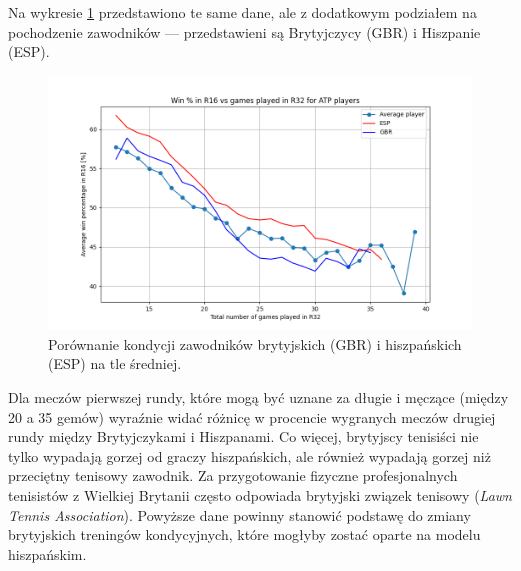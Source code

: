\documentclass[12pt, a4paper]{article}
\begin{document}
Na wykresie \ref{fig:gbr_vs_esp} przedstawiono te same dane, ale z dodatkowym podziałem na pochodzenie zawodników --- przedstawieni są Brytyjczycy (GBR) i Hiszpanie (ESP).
\begin{figure}[h]
    \includegraphics[width=\textwidth]{figures/gbr_vs_esp.png}
    \caption{Porównanie kondycji zawodników brytyjskich (GBR) i hiszpańskich (ESP) na tle średniej.}
    \label{fig:gbr_vs_esp}
\end{figure}
Dla meczów pierwszej rundy, które mogą być uznane za długie i męczące (między 20 a 35 gemów) wyraźnie widać różnicę w procencie wygranych meczów drugiej rundy między Brytyjczykami i Hiszpanami. Co więcej, brytyjscy tenisiści nie tylko wypadają gorzej od graczy hiszpańskich, ale również wypadają gorzej niż przeciętny tenisowy zawodnik. Za przygotowanie fizyczne profesjonalnych tenisistów z Wielkiej Brytanii często odpowiada brytyjski związek tenisowy (\textit{Lawn Tennis Association}). Powyższe dane powinny stanowić podstawę do zmiany brytyjskich treningów kondycyjnych, które mogłyby zostać oparte na modelu hiszpańskim.
\end{document}
